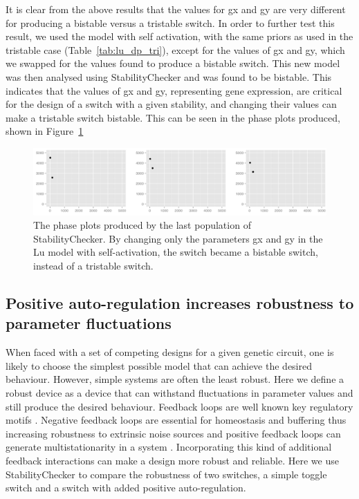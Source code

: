 It is clear from the above results that the values for gx and gy are very different for producing a bistable versus a tristable switch. In order to further test this result, we used the model with self activation, with the same priors as used in the tristable case (Table~\ref{tab:lu_dp_tri}), except for the values of gx and gy, which we swapped for the values found to produce a bistable switch. This new model was then analysed using StabilityChecker and was found to be bistable. This indicates that the values of gx and gy, representing gene expression, are critical for the design of a switch with a given stability, and changing their values can make a tristable switch bistable. This can be seen in the phase plots produced, shown in Figure~\ref{fig:lu_bi_tri}

\begin{figure}[t]
\centering
\includegraphics[scale=0.3]{chapterModelling/images/Lu/tri/phase_plot_tri_bi.png}
\caption{The phase plots produced by the last population of StabilityChecker. By changing only the parameters gx and gy in the Lu model with self-activation, the switch became a bistable switch, instead of a tristable switch.}
\label{fig:lu_bi_tri}
\end{figure}
\clearpage
\subsection{Positive auto-regulation increases robustness to parameter fluctuations}

When faced with a set of competing designs for a given genetic circuit, one is likely to choose the simplest possible model that can achieve the desired behaviour. However, simple systems are often the least robust. Here we define a robust device as a device that can withstand fluctuations in parameter values and still produce the desired behaviour. Feedback loops are well known key regulatory motifs \autocite{Brandman:2005ci}. Negative feedback loops are essential for homeostasis and buffering \autocite{Thomas:1995id} thus increasing robustness to extrinsic noise sources and positive feedback loops can generate multistationarity in a system \autocite{Thomas:1995id}. Incorporating this kind of additional feedback interactions can make a design more robust and reliable. Here we use StabilityChecker to compare the robustness of two switches, a simple toggle switch and a switch with added positive auto-regulation. 

